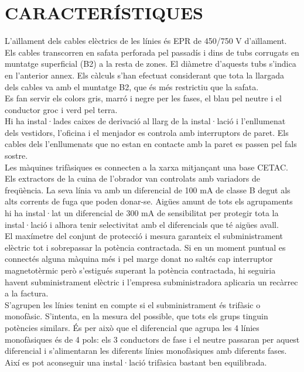 \chapter{\uppercase{Característiques}}
L'aïllament dels cables elèctrics de les línies és EPR de 450/750 V d'aïllament. Els cables transcorren en safata perforada pel passadís i dins de tubs corrugats en muntatge superficial (B2) a la resta de zones. El diàmetre d'aquests tubs s'indica en l'anterior annex. Els càlculs s'han efectuat considerant que tota la llargada dels cables va amb el muntatge B2, que és més restrictiu que la safata.\\
\newline Es fan servir els colors gris, marró i negre per les fases, el blau pel neutre i el conductor groc i verd pel terra.\\
\newline Hi ha instal·lades caixes de derivació al llarg de la instal·lació i l'enllumenat dels vestidors, l'oficina i el menjador es controla amb interruptors de paret. Els cables dels l'enllumenats que no estan en contacte amb la paret es passen pel fals sostre.\\
\newline Les màquines trifàsiques es connecten a la xarxa mitjançant una base CETAC.\\
\newline Els extractors de la cuina de l'obrador van controlats amb variadors de freqüència. La seva línia va amb un diferencial de 100 mA de classe B degut als alts corrents de fuga que poden donar-se. Aigües amunt de tots els agrupaments hi ha instal·lat un diferencial de 300 mA de sensibilitat per protegir tota la instal·lació i alhora tenir selectivitat amb el diferencials que té aigües avall.\\
\newline El maxímetre del conjunt de protecció i mesura garanteix el subministrament elèctric tot i sobrepassar la potència contractada. Si en un moment puntual es connectés alguna màquina més i pel marge donat no saltés cap interruptor magnetotèrmic però s'estigués superant la potència contractada, hi seguiria havent subministrament elèctric i l'empresa subministradora aplicaria un recàrrec a la factura.\\
\newline 
S'agrupen les línies tenint en compte si el subministrament és trifàsic o monofàsic. S'intenta, en la mesura del possible, que tots els grups tinguin potències similars. És per això que el diferencial que agrupa les 4 línies monofàsiques és de 4 pols: els 3 conductors de fase i el neutre passaran per aquest diferencial i s'alimentaran les diferents línies monofàsiques amb diferents fases. Així es pot aconseguir una instal·lació trifàsica bastant ben equilibrada.\\

